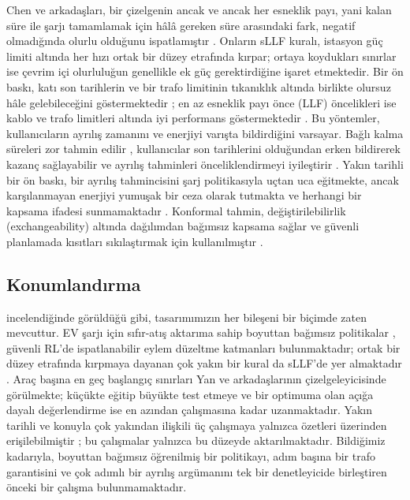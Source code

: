 Chen ve arkadaşları, bir çizelgenin ancak ve ancak her esneklik payı, yani kalan süre ile şarjı tamamlamak için hâlâ gereken süre arasındaki fark, negatif olmadığında olurlu olduğunu ispatlamıştır \cite{chen2022smoothed}.
Onların sLLF kuralı, istasyon güç limiti altında her hızı ortak bir düzey etrafında kırpar; ortaya koydukları sınırlar ise çevrim içi olurluluğun genellikle ek güç gerektirdiğine işaret etmektedir.
Bir ön baskı, katı son tarihlerin ve bir trafo limitinin tıkanıklık altında birlikte olursuz hâle gelebileceğini göstermektedir \cite{reddy2026deadline}; en az esneklik payı önce (LLF) öncelikleri ise kablo ve trafo limitleri altında iyi performans göstermektedir \cite{vanhuffelen2025grid,christensen2025multiagent}.
Bu yöntemler, kullanıcıların ayrılış zamanını ve enerjiyi varışta bildirdiğini varsayar.
Bağlı kalma süreleri zor tahmin edilir \cite{dyo2022behavior}, kullanıcılar son tarihlerini olduğundan erken bildirerek kazanç sağlayabilir \cite{ferragut2022scheduling} ve ayrılış tahminleri önceliklendirmeyi iyileştirir \cite{frendo2021improving}.
Yakın tarihli bir ön baskı, bir ayrılış tahmincisini şarj politikasıyla uçtan uca eğitmekte, ancak karşılanmayan enerjiyi yumuşak bir ceza olarak tutmakta ve herhangi bir kapsama ifadesi sunmamaktadır \cite{gabriele2026forecasting}.
Konformal tahmin, değiştirilebilirlik (exchangeability) altında dağılımdan bağımsız kapsama sağlar \cite{lei2018distributionfree,angelopoulos2023conformal} ve güvenli planlamada kısıtları sıkılaştırmak için kullanılmıştır \cite{lindemann2023safe}.

\subsection{Konumlandırma}\label{sec:rw-position}

 incelendiğinde görüldüğü gibi, tasarımımızın her bileşeni bir biçimde zaten mevcuttur.
EV şarjı için sıfır-atış aktarıma sahip boyuttan bağımsız politikalar \cite{orfanoudakis2026graph,wang2026hetgps}, güvenli RL'de ispatlanabilir eylem düzeltme katmanları \cite{tabas2022computationally,wan2025logicinformed} bulunmaktadır; ortak bir düzey etrafında kırpmaya dayanan çok yakın bir kural da sLLF'de yer almaktadır \cite{chen2022smoothed}.
Araç başına en geç başlangıç sınırları Yan ve arkadaşlarının çizelgeleyicisinde \cite{yan2026hierarchical} görülmekte; küçükte eğitip büyükte test etmeye ve bir optimuma olan açığa dayalı değerlendirme ise en azından \cite{sadeghianpourhamami2020definition} çalışmasına kadar uzanmaktadır.
Yakın tarihli ve konuyla çok yakından ilişkili üç çalışmaya yalnızca özetleri üzerinden erişilebilmiştir \cite{orfanoudakis2026can,song2025longterm,eland2026safe}; bu çalışmalar yalnızca bu düzeyde aktarılmaktadır.
Bildiğimiz kadarıyla, boyuttan bağımsız öğrenilmiş bir politikayı, adım başına bir trafo garantisini ve çok adımlı bir ayrılış argümanını tek bir denetleyicide birleştiren önceki bir çalışma bulunmamaktadır.

